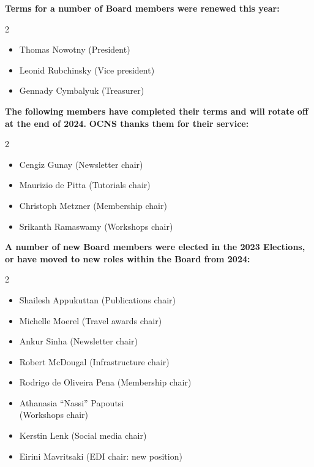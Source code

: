 \documentclass[11pt,a4paper,oneside]{article}
\begin{document}
\vspace{4ex}
\textbf{Terms for a number of Board members were renewed this year:}
\begin{multicols}{2}
  \begin{itemize}
    \item Thomas Nowotny (President)
    \item Leonid Rubchinsky (Vice president)
    \item Gennady Cymbalyuk (Treasurer)
  \end{itemize}
\end{multicols}

\textbf{The following members have completed their terms and will rotate off at the end of 2024.}
\textbf{OCNS thanks them for their service:}
\begin{multicols}{2}
  \begin{itemize}
    \item Cengiz Gunay (Newsletter chair)
    \item Maurizio de Pitta (Tutorials chair)
    \item Christoph Metzner (Membership chair)
    \item Srikanth Ramaswamy (Workshops chair)
  \end{itemize}
\end{multicols}

\textbf{A number of new Board members were elected in the 2023 Elections, or have moved to new roles within the Board from 2024:}
\begin{multicols}{2}
  \begin{itemize}
    \item Shailesh Appukuttan (Publications chair)
    \item Michelle Moerel (Travel awards chair)
    \item Ankur Sinha (Newsletter chair)
    \item Robert McDougal (Infrastructure chair)
    \item Rodrigo de Oliveira Pena (Membership chair)
    \item Athanasia \enquote{Nassi} Papoutsi\\(Workshops chair)
    \item Kerstin Lenk (Social media chair)
    \item Eirini Mavritsaki (EDI chair: new position)
  \end{itemize}
\end{multicols}

\clearpage
\end{document}
